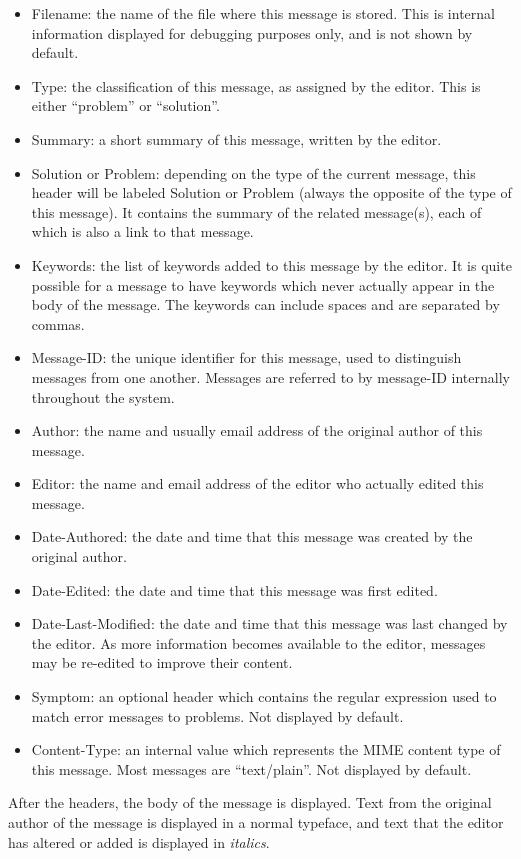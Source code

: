 \begin{itemize}
\item Filename: the name of the file where this message is stored. This is
  internal information displayed for debugging purposes only, and is not shown
  by default.
\item Type: the classification of this message, as assigned by the editor.
  This is either ``problem'' or ``solution''.
\item Summary: a short summary of this message, written by the editor.
\item Solution or Problem: depending on the type of the current message,
  this header will be labeled Solution or Problem (always the opposite
  of the type of this message). It contains the summary of the related
  message(s), each of which is also a link to that message.
\item Keywords: the list of keywords added to this message by the editor. It is
  quite possible for a message to have keywords which never actually appear in
  the body of the message. The keywords can include spaces and are separated by
  commas.
\item Message-ID: the unique identifier for this message, used to distinguish
  messages from one another. Messages are referred to by message-ID internally
  throughout the system.
\item Author: the name and usually email address of the original author of this
  message.
\item Editor: the name and email address of the editor who actually edited this
  message.
\item Date-Authored: the date and time that this message was created by the
  original author.
\item Date-Edited: the date and time that this message was first edited.
\item Date-Last-Modified: the date and time that this message was last changed
  by the editor. As more information becomes available to the editor, messages
  may be re-edited to improve their content.
\item Symptom: an optional header which contains the regular expression used to
  match error messages to problems. Not displayed by default.
\item Content-Type: an internal value which represents the MIME content type of
  this message. Most messages are ``text/plain''. Not displayed by default.
\end{itemize}

After the headers, the body of the message is displayed. Text from the original
author of the message is displayed in a normal typeface, and text that the
editor has altered or added is displayed in {\em italics}.

